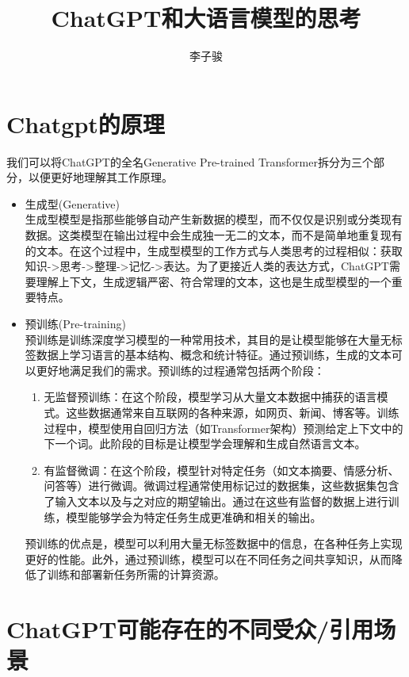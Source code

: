 \documentclass[a4paper]{article}
\title{\textbf{ChatGPT和大语言模型的思考}}
\author{李子骏}
\date{}
\begin{document}
\setlength{\parindent}{2em}

\maketitle

\section{Chatgpt的原理}

我们可以将ChatGPT的全名Generative Pre-trained Transformer拆分为三个部分，以便更好地理解其工作原理。

\begin{itemize}
    \item 生成型(Generative)\\
        生成型模型是指那些能够自动产生新数据的模型，而不仅仅是识别或分类现有数据。这类模型在输出过程中会生成独一无二的文本，而不是简单地重复现有的文本。在这个过程中，生成型模型的工作方式与人类思考的过程相似：获取知识->思考->整理->记忆->表达。为了更接近人类的表达方式，ChatGPT需要理解上下文，生成逻辑严密、符合常理的文本，这也是生成型模型的一个重要特点。
    \item 预训练(Pre-training)\\
        预训练是训练深度学习模型的一种常用技术，其目的是让模型能够在大量无标签数据上学习语言的基本结构、概念和统计特征。通过预训练，生成的文本可以更好地满足我们的需求。预训练的过程通常包括两个阶段：
    \begin{enumerate}
        \item 无监督预训练：在这个阶段，模型学习从大量文本数据中捕获的语言模式。这些数据通常来自互联网的各种来源，如网页、新闻、博客等。训练过程中，模型使用自回归方法（如Transformer架构）预测给定上下文中的下一个词。此阶段的目标是让模型学会理解和生成自然语言文本。
        \item 有监督微调：在这个阶段，模型针对特定任务（如文本摘要、情感分析、问答等）进行微调。微调过程通常使用标记过的数据集，这些数据集包含了输入文本以及与之对应的期望输出。通过在这些有监督的数据上进行训练，模型能够学会为特定任务生成更准确和相关的输出。
    \end{enumerate}
    预训练的优点是，模型可以利用大量无标签数据中的信息，在各种任务上实现更好的性能。此外，通过预训练，模型可以在不同任务之间共享知识，从而降低了训练和部署新任务所需的计算资源。
\end{itemize}

\section{ChatGPT可能存在的不同受众/引用场景}
\end{document}

